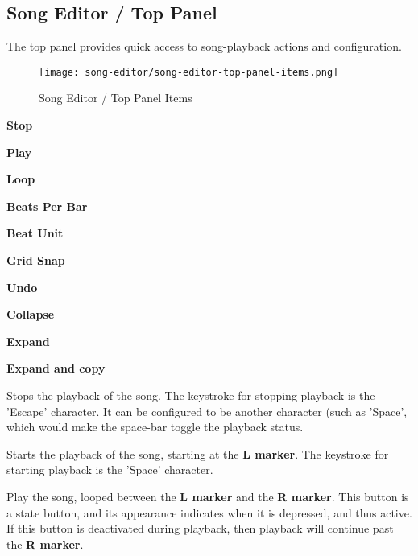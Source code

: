 \subsection{Song Editor / Top Panel}
\label{subsec:seq24_song_editor_top}

   The top panel provides quick access to song-playback actions and
   configuration.

\begin{figure}[H]
   \centering 
   \texttt{[image: song-editor/song-editor-top-panel-items.png]}
   \caption{Song Editor / Top Panel Items}
   \label{fig:song_editor_top_panel_items}
\end{figure}

   \begin{enumber}
      \item \textbf{Stop}
      \item \textbf{Play}
      \item \textbf{Loop}
      \item \textbf{Beats Per Bar}
      \item \textbf{Beat Unit}
      \item \textbf{Grid Snap}
      \item \textbf{Undo}
      \item \textbf{Collapse}
      \item \textbf{Expand}
      \item \textbf{Expand and copy}
   \end{enumber}

   \setcounter{ItemCounter}{0}      %

   Stops the playback of the song.
   The keystroke for stopping playback is the 'Escape' character.
   It can be configured to be another character (such as 'Space', which
   would make the space-bar toggle the playback status.

   Starts the playback of the song, starting at the \textbf{L marker}.
   The keystroke for starting playback is the 'Space' character.

   Play the song, looped between the \textbf{L marker} and the
   \textbf{R marker}.
   This button is a state button, and its appearance indicates when it is
   depressed, and thus active.
   If this button is deactivated during playback, then playback will
   continue past the \textbf{R marker}.

